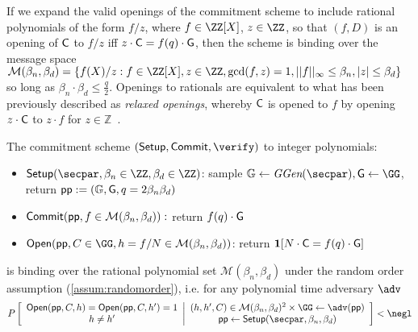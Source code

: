 If we expand the valid openings of the commitment scheme to include rational polynomials of the form $f/z$, where $f \in \ZZ[X]$, $z \in \ZZ$, so that $(f,D)$ is an opening of $\gr{C}$ to $f/z$ iff $z \cdot \gr{C} = f(q) \cdot \gr{G}$, then the scheme is binding over the message space $\mathcal{M}(\beta_n, \beta_d) =  \{f(X)/z: f \in \ZZ[X], z \in \ZZ, \gcd(f,z) = 1, ||f||_\infty \leq \beta_n, |z| \leq \beta_d \}$ so long as $\beta_n \cdot \beta_d \leq \frac{q}{2}$. 
Openings to rationals are equivalent to what has been previously described as \emph{relaxed openings}, whereby $\gr{C}$ is opened to $f$ by opening $z \cdot \gr{C}$ to $z \cdot f$ for $z \in \mathbb{Z}$~\cite{C:BDFG21}. 

\begin{lemma}
\label{lem:darkcommit}
	The commitment scheme $(\setup,\commit, \verify)$ to integer polynomials: 
	\begin{itemize} 
	\item $\setup(\secpar,\beta_n\in \ZZ,\beta_d \in \ZZ)$: sample $\mathbb{G} \gets \ggen(\secpar) ,\Generator \gets \GG$, return $\crs := (\mathbb{G}, \gr{G}, q =2 \beta_n\beta_d)$
	\item $\textsf{{Commit}}(\textsf{pp},f\in \mathcal{M}(\beta_n,\beta_d)):$ return $f(q) \cdot \gr{G} $
	\item $\open(\crs,C\in \GG,h = f/N  \in \mathcal{M}(\beta_n,\beta_d) )$: return $\predicate{N\cdot\Commitment = f(q)\cdot \Generator} $
	\end{itemize} 
	is binding over the rational polynomial set $\mathcal{M}(\beta_n, \beta_d)$ under the random order assumption (\ref{assum:randomorder}), i.e. for any polynomial time adversary $\adv$ $$P\left[\begin{array}{c} 
	\open(\crs,C,h)=\open(\crs,C,h')=1\\
	h\neq h' 
\end{array}
 \middle|\begin{array}{c}
(h,h',C) \in \mathcal{M}(\beta_n,\beta_d)^2 \times \GG  \gets \adv(\crs)\\	
\crs \gets \setup(\secpar,\beta_n,\beta_d)
\end{array}
	 \right]<\negl$$
\end{lemma}
